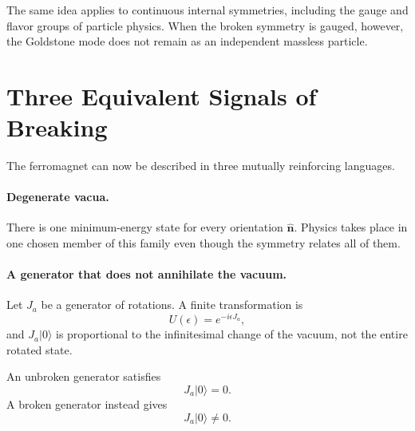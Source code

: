 The same idea applies to continuous internal symmetries, including the gauge and flavor groups of particle physics. When the broken symmetry is gauged, however, the Goldstone mode does not remain as an independent massless particle.

\begin{classroomqa}
\end{classroomqa}

\section{Three Equivalent Signals of Breaking}

The ferromagnet can now be described in three mutually reinforcing languages.

\paragraph{Degenerate vacua.}
There is one minimum-energy state for every orientation \(\hat{\mathbf n}\). Physics takes place in one chosen member of this family even though the symmetry relates all of them.

\paragraph{A generator that does not annihilate the vacuum.}
Let \(J_a\) be a generator of rotations. A finite transformation is
\begin{equation}
U(\epsilon)=e^{-i\epsilon J_a},
\end{equation}
and \(J_a|0\rangle\) is proportional to the infinitesimal change of the vacuum, not the entire rotated state.

\begin{classroomqa}
\end{classroomqa}

An unbroken generator satisfies
\begin{equation}
J_a|0\rangle=0.
\label{eq:l9-unbroken-generator}
\end{equation}
A broken generator instead gives
\begin{equation}
J_a|0\rangle\neq0.
\label{eq:l9-broken-generator}
\end{equation}

